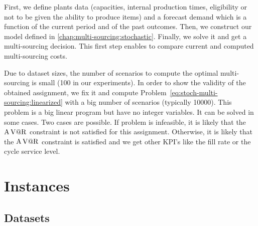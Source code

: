 First, we define plants data (capacities, internal production times, eligibility or not to be given the ability to produce items) and a forecast demand which is a function of the current period and of the past outcomes.
Then, we construct our model defined in \cref{chap:multi-sourcing:stochastic}.
Finally, we solve it and get a multi-sourcing decision.
This first step enables to compare current and computed multi-sourcing costs.


Due to dataset sizes, the number of scenarios to compute the optimal multi-sourcing is small (100 in our experiments).
In order to show the validity of the obtained assignment, we fix it and compute Problem~\eqref{eq:stoch-multi-sourcing:linearized} with a big number of scenarios (typically 10000).
This problem is a big linear program but have no integer variables.
It can be solved in some cases.
Two cases are possible.
If problem is infeasible, it is likely that the $\operatorname{A\operatorname{V@R}}$ constraint is not satisfied for this assignment.
Otherwise, it is likely that the $\operatorname{A\operatorname{V@R}}$ constraint is satisfied and we get other KPI's like the fill rate or the cycle service level.




\section{Instances}


\subsection{Datasets}


